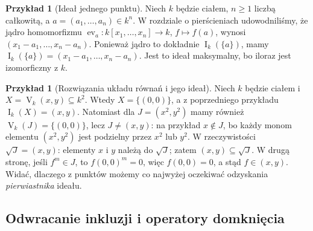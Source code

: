 \documentclass[11pt,a4paper,openany]{report}
\numberwithin{equation}{section}
\theoremstyle{plain}
\theoremstyle{definition}
\newtheorem{przyklad}[twierdzenie]{Przykład}
\theoremstyle{remark}
\newcommand{\V}{\operatorname V}
\newcommand{\I}{\operatorname I}
\newcommand{\ev}{\operatorname{ev}}
\begin{document}
\begin{przyklad}[Ideał jednego punktu]
Niech $k$ będzie ciałem, $n\ge1$ liczbą całkowitą,
a $a=(a_1,\dots,a_n)\in k^n$. W rozdziale o pierścieniach
udowodniliśmy, że jądro homomorfizmu
$\ev_a:k[x_1,\dots,x_n]\to k$, $f\mapsto f(a)$,
wynosi $(x_1-a_1,\dots,x_n-a_n)$.
Ponieważ jądro to dokładnie $\I_k(\{a\})$, mamy
$\I_k(\{a\})=(x_1-a_1,\dots,x_n-a_n)$.
Jest to ideał maksymalny, bo iloraz jest izomorficzny z $k$.
\end{przyklad}

\begin{przyklad}[Rozwiązania układu równań i jego ideał]
Niech $k$ będzie ciałem i $X=\V_k(x,y)\subseteq k^2$. Wtedy $X=\{(0,0)\}$,
a z poprzedniego przykładu $\I_k(X)=(x,y)$.
Natomiast dla $J=(x^2,y^2)$ mamy również
$\V_k(J)=\{(0,0)\}$, lecz $J\ne(x,y)$:
na przykład $x\notin J$, bo każdy monom elementu
$(x^2,y^2)$ jest podzielny przez $x^2$ lub $y^2$.
W rzeczywistości $\sqrt J=(x,y)$: elementy $x$ i $y$
należą do $\sqrt J$; zatem $(x,y)\subseteq\sqrt J$.
W drugą stronę, jeśli $f^m\in J$, to $f(0,0)^m=0$,
więc $f(0,0)=0$, a stąd $f\in(x,y)$.
Widać, dlaczego z punktów możemy co najwyżej oczekiwać
odzyskania \emph{pierwiastnika} ideału.
\end{przyklad}

\subsection{Odwracanie inkluzji i operatory domknięcia}
\end{document}
